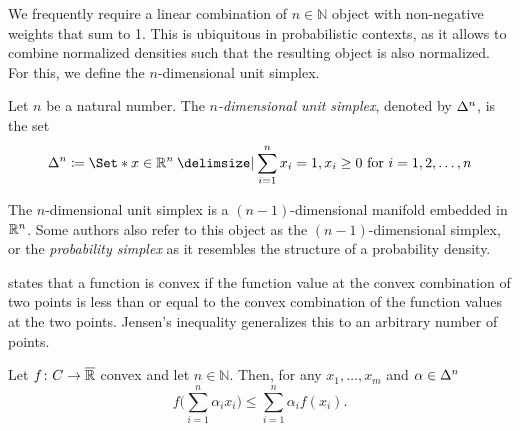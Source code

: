 We frequently require a linear combination of \( n \in \mathbb{N} \) object with non-negative weights that sum to \num{1}.
This is ubiquitous in probabilistic contexts, as it allows to combine normalized densities such that the resulting object is also normalized.
For this, we define the \( n \)-dimensional unit simplex.
\begin{definition}%
	\label{def:unit simplex}
	Let \( n \) be a natural number.
	The \emph{\( n \)-dimensional unit simplex}, denoted by \( \Delta^n \), is the set
	\[
		\Simplex^n \coloneqq \Set*{x \in \R^n \given \sum_{i=1}^n x_i = \num{1}, x_i \geq \num{0} \text{ for } i = \num{1}, \num{2}, \dotsc, n }
	\]
\end{definition}
The \( n \)-dimensional unit simplex is a \( (n - \num{1}) \)-dimensional manifold embedded in \( \mathbb{R}^n \).
Some authors also refer to this object as the \( (n - \num{1}) \)-dimensional simplex, or the \emph{probability simplex} as it resembles the structure of a probability density.
\begin{sidefigure}
	\caption[The unit simplex in two and three dimensions]{%
		The unit simplex in two (top) and three (bottom) dimensions.
	}%
	\label{fig:simplices}
\end{sidefigure}

 states that a function is convex if the function value at the convex combination of two points is less than or equal to the convex combination of the function values at the two points.
Jensen's inequality generalizes this to an arbitrary number of points.
\begin{theorem}
	Let \( f \colon C \to \overline{\mathbb{R}} \) convex and let \( n \in \mathbb{N} \).
	Then, for any \( x_{\num{1}}, \dotsc, x_m \) and \( \alpha \in \Delta^n \)
	\[
		f\biggl( \sum_{i=\num{1}}^n \alpha_i x_i \biggr) \leq \sum_{i=\num{1}}^n \alpha_i f(x_i).
	\]
\end{theorem}


